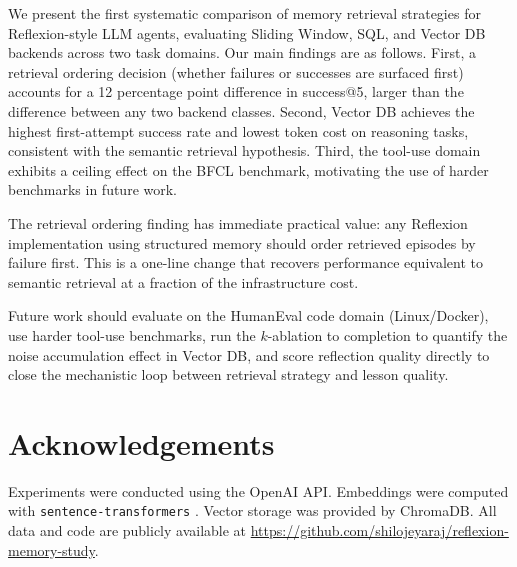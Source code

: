 \documentclass{article}
\begin{document}
We present the first systematic comparison of memory retrieval strategies
for Reflexion-style LLM agents, evaluating Sliding Window, SQL, and Vector
DB backends across two task domains. Our main findings are as follows.
First, a retrieval ordering decision (whether failures or successes are
surfaced first) accounts for a 12 percentage point difference in success@5,
larger than the difference between any two backend classes. Second, Vector
DB achieves the highest first-attempt success rate and lowest token cost on
reasoning tasks, consistent with the semantic retrieval hypothesis. Third,
the tool-use domain exhibits a ceiling effect on the BFCL benchmark,
motivating the use of harder benchmarks in future work.

The retrieval ordering finding has immediate practical value: any Reflexion
implementation using structured memory should order retrieved episodes by
failure first. This is a one-line change that recovers performance
equivalent to semantic retrieval at a fraction of the infrastructure cost.

Future work should evaluate on the HumanEval code domain (Linux/Docker),
use harder tool-use benchmarks, run the $k$-ablation to completion to
quantify the noise accumulation effect in Vector DB, and score reflection
quality directly to close the mechanistic loop between retrieval strategy
and lesson quality.

\section*{Acknowledgements}
Experiments were conducted using the OpenAI API. Embeddings were computed
with \texttt{sentence-transformers} \citep{reimers2019sentencebert}. Vector
storage was provided by ChromaDB. All data and code are publicly available
at \url{https://github.com/shilojeyaraj/reflexion-memory-study}.



\end{document}
